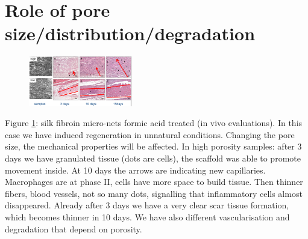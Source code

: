\section{Role of pore size/distribution/degradation}
\begin{figure}[ht]
\centering
\includegraphics[width=0.4\textwidth]{silk}
\caption{\label{fig:silk}}
\end{figure}

\noindent
Figure \ref{fig:silk}: silk fibroin micro-nets formic acid treated (in vivo evaluations).
In this case we have induced regeneration in unnatural conditions.
Changing the pore size, the mechanical properties will be affected. In high porosity samples: after 3 days we have granulated tissue (dots are cells), the scaffold was able to promote movement inside.
At 10 days the arrows are indicating new capillaries.
Macrophages are at phase II, cells have more space to build tissue.
Then thinner fibers, blood vessels, not so many dots, signalling that inflammatory cells almost disappeared.
Already after 3 days we have a very clear scar tissue formation, which becomes thinner in 10 days.
\noindent
We have also different vascularisation and degradation that depend on porosity.

